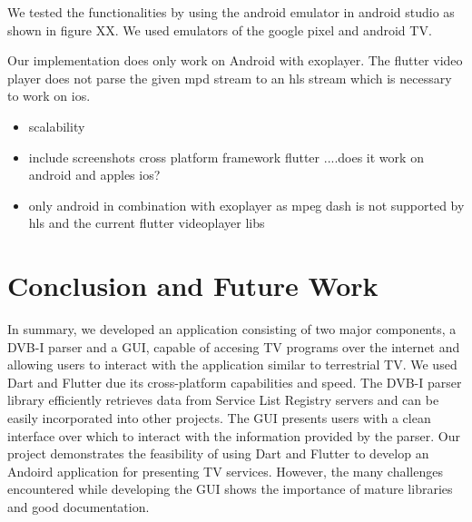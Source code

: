 \documentclass[conference]{IEEEtran}
\begin{document}


We tested the functionalities by using the android emulator in android studio as shown in figure XX. We used emulators of the  google pixel and android TV. 


Our implementation does only work on Android with exoplayer. The flutter video player does not parse the given mpd stream to an hls stream which is necessary to work on ios.



\begin{itemize}
	\item scalability
	\item include screenshots cross platform framework flutter ....does it work on android and apples ios?
	\item only android in combination with exoplayer as mpeg dash is not supported by hls and the current flutter videoplayer libs
\end{itemize}




\section{Conclusion and Future Work}
In summary, we developed an application consisting of two major components, a DVB-I parser and a GUI, capable of accesing TV programs over the internet and allowing users to interact with the application similar to terrestrial TV.  We used Dart and Flutter due its cross-platform capabilities and speed. The DVB-I parser library efficiently retrieves data from Service List Registry servers and can be easily incorporated into other projects. The GUI presents users with a clean interface over which to interact with the information provided by the parser. Our project demonstrates the feasibility of using Dart and Flutter to develop an Andoird application for presenting TV services. However, the many challenges encountered while developing the GUI shows the importance of mature libraries and good documentation. \\\par
\end{document}
